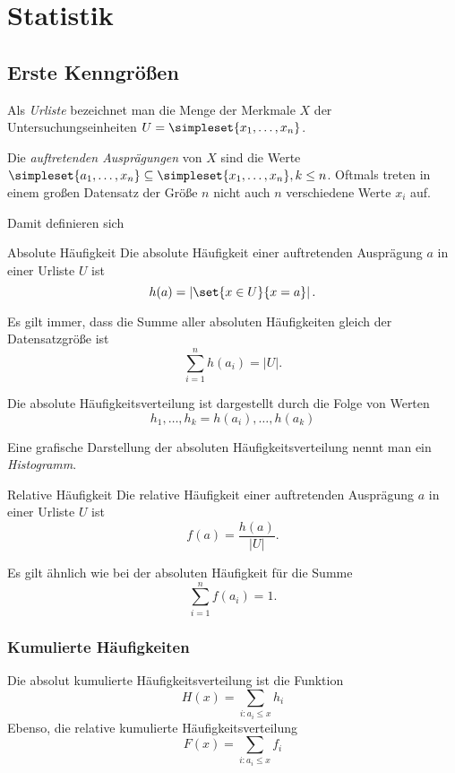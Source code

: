 \chapter{Statistik}
\section{Erste Kenngrößen}
Als \emph{Urliste} bezeichnet man die Menge der Merkmale $X$ der Untersuchungseinheiten $U=\simpleset{x_1,\ldots,x_n}$.

Die \emph{auftretenden Ausprägungen} von $X$ sind die Werte $\simpleset{a_1,\ldots,x_n}\subseteq\simpleset{x_1,\ldots,x_n}, k\leq n$.
Oftmals treten in einem großen Datensatz der Größe $n$ nicht auch $n$ verschiedene Werte $x_i$ auf.

Damit definieren sich 
\begin{definition}{Absolute Häufigkeit}
	Die absolute Häufigkeit einer auftretenden Ausprägung $a$ in einer Urliste $U$ ist
	\begin{equation*}
		h(a)=\left|\set{x\in U}{x=a}\right|.
	\end{equation*}
\end{definition}
Es gilt immer, dass die Summe aller absoluten Häufigkeiten gleich der Datensatzgröße ist
\begin{equation*}
	\sum\limits_{i=1}^n h(a_i)=|U|.
\end{equation*}

Die absolute Häufigkeitsverteilung ist dargestellt durch die Folge von Werten
$$h_1,\ldots,h_k=h(a_i),\ldots,h(a_k)$$


Eine grafische Darstellung der absoluten Häufigkeitsverteilung nennt man ein \emph{Histogramm}.

\begin{definition}{Relative Häufigkeit}
	Die relative Häufigkeit einer auftretenden Ausprägung $a$ in einer Urliste $U$ ist
	\begin{equation*}
		f(a)=\frac{h(a)}{|U|}.
	\end{equation*}
\end{definition}
Es gilt ähnlich wie bei der absoluten Häufigkeit für die Summe
\begin{equation*}
	\sum\limits_{i=1}^n f(a_i)=1.
\end{equation*}

\subsection{Kumulierte Häufigkeiten}
Die absolut kumulierte Häufigkeitsverteilung ist die Funktion
\begin{equation*}
	H(x)=\sum\limits_{i:a_i\leq x} h_i
\end{equation*}
Ebenso, die relative kumulierte Häufigkeitsverteilung
\begin{equation*}
	F(x)=\sum\limits_{i:a_i\leq x} f_i
\end{equation*}

